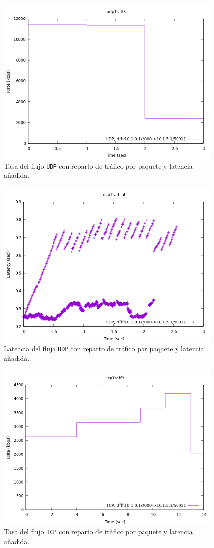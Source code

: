 \documentclass[11pt]{article}
\begin{document}
                \begin{figure}
                    \centering
                    \includegraphics[width=0.6\linewidth]{udpTraffAddedLatR.png}
                    \caption{Tasa del flujo \texttt{UDP} con reparto de tráfico por paquete y latencia añadida.}
                    \label{fig:udpTraffAddedLatR}
                \end{figure}

                \begin{figure}
                    \centering
                    \includegraphics[width=0.6\linewidth]{udpTraffAddedLatLat.png}
                    \caption{Latencia del flujo \texttt{UDP} con reparto de tráfico por paquete y latencia añadida.}
                    \label{fig:udpTraffAddedLatLat}
                \end{figure}

                \begin{figure}
                    \centering
                    \includegraphics[width=0.6\linewidth]{tcpTraffAddedLatR.png}
                    \caption{Tasa del flujo \texttt{TCP} con reparto de tráfico por paquete y latencia añadida.}
                    \label{fig:tcpTraffAddedLatR}
                \end{figure}
\end{document}
